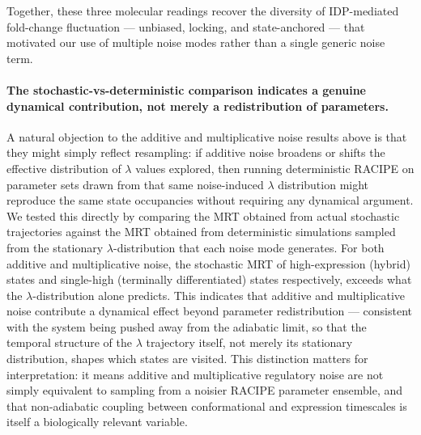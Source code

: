 \documentclass[11pt]{article}
\begin{document}
Together, these three molecular readings recover the diversity of IDP-mediated fold-change fluctuation --- unbiased, locking, and state-anchored --- that motivated our use of multiple noise modes rather than a single generic noise term.


\paragraph{The stochastic-vs-deterministic comparison indicates a genuine dynamical contribution, not merely a redistribution of parameters.}
A natural objection to the additive and multiplicative noise results above is that they might simply reflect resampling: if additive noise broadens or shifts the effective distribution of $\lambda$ values explored, then running deterministic RACIPE on parameter sets drawn from that same noise-induced $\lambda$ distribution might reproduce the same state occupancies without requiring any dynamical argument. We tested this directly by comparing the MRT obtained from actual stochastic trajectories against the MRT obtained from deterministic simulations sampled from the stationary $\lambda$-distribution that each noise mode generates. 
For both additive and multiplicative noise, the stochastic MRT of high-expression (hybrid) states and single-high (terminally differentiated) states respectively, exceeds what the $\lambda$-distribution alone predicts. This indicates that additive and multiplicative noise contribute a dynamical effect beyond parameter redistribution --- consistent with the system being pushed away from the adiabatic limit, so that the temporal structure of the $\lambda$ trajectory itself, not merely its stationary distribution, shapes which states are visited. This distinction matters for interpretation: it means additive and multiplicative regulatory noise are not simply equivalent to sampling from a noisier RACIPE parameter ensemble, and that non-adiabatic coupling between conformational and expression timescales is itself a biologically relevant variable.
\end{document}
